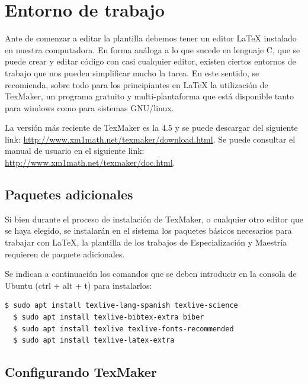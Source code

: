 
\section{Entorno de trabajo}

Ante de comenzar a editar la plantilla debemos tener un editor \LaTeX{} instalado en nuestra computadora.  En forma análoga a lo que sucede en lenguaje C, que se puede crear y editar código con casi cualquier editor, existen ciertos entornos de trabajo que nos pueden simplificar mucho la tarea.  En este sentido, se recomienda, sobre todo para los principiantes en \LaTeX{} la utilización de TexMaker, un programa gratuito y multi-plantaforma que está disponible tanto para windows como para sistemas GNU/linux.

La versión más reciente de TexMaker es la 4.5 y se puede descargar del siguiente link: \url{http://www.xm1math.net/texmaker/download.html}. Se puede consultar el manual de usuario en el siguiente link: \url{http://www.xm1math.net/texmaker/doc.html}.
 

\subsection{Paquetes adicionales}

Si bien durante el proceso de instalación de TexMaker, o cualquier otro editor que se haya elegido, se instalarán en el sistema los paquetes básicos necesarios para trabajar con \LaTeX{}, la plantilla de los trabajos de Especialización y Maestría requieren de paquete adicionales.

Se indican a continuación los comandos que se deben introducir en la consola de Ubuntu (ctrl + alt + t) para instalarlos:

\begin{lstlisting}[language=bash]
  $ sudo apt install texlive-lang-spanish texlive-science 
  $ sudo apt install texlive-bibtex-extra biber
  $ sudo apt install texlive texlive-fonts-recommended
  $ sudo apt install texlive-latex-extra
\end{lstlisting}


\subsection{Configurando TexMaker}



